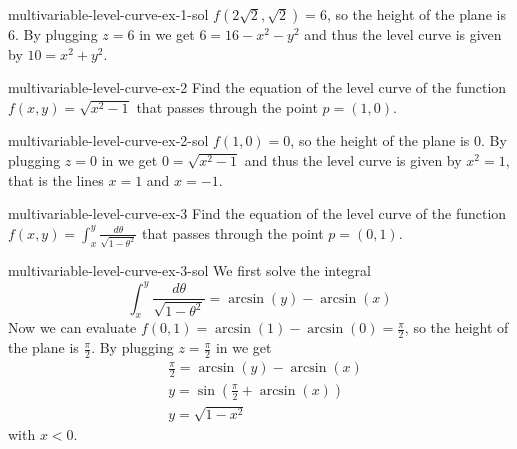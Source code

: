 \documentclass[preview]{standalone}
\begin{document}
\begin{snippetsolution}{multivariable-level-curve-ex-1-sol}{}
    \phantom{}\(f(2\sqrt{2}, \sqrt{2}) = 6\), so the height of the plane is 6.
    By plugging \(z=6\) in we get \(6=16-x^2-y^2\)
    and thus the level curve is given by \(10=x^2+y^2\).
\end{snippetsolution}

\begin{snippetexercise}{multivariable-level-curve-ex-2}{}
    Find the equation of the level curve of the function \(f(x,y) = \sqrt{x^2-1}\)
    that passes through the point \(p=(1,0)\).
\end{snippetexercise}

\begin{snippetsolution}{multivariable-level-curve-ex-2-sol}{}
    \phantom{}\(f(1, 0) = 0\), so the height of the plane is 0.
    By plugging \(z=0\) in we get \(0 = \sqrt{x^2-1}\)
    and thus the level curve is given by \(x^2=1\), that is
    the lines \(x=1\) and \(x=-1\).
\end{snippetsolution}

\begin{snippetexercise}{multivariable-level-curve-ex-3}{}
    Find the equation of the level curve of the function \(f(x,y) = \int_x^y \frac{d\theta}{\sqrt{1-\theta^2}}\)
    that passes through the point \(p=(0,1)\).
\end{snippetexercise}

\begin{snippetsolution}{multivariable-level-curve-ex-3-sol}{}
    We first solve the integral
    \[ \int_x^y \frac{d\theta}{\sqrt{1-\theta^2}} = \arcsin(y) - \arcsin(x) \]
    Now we can evaluate \(f(0,1) = \arcsin(1) - \arcsin(0) = \frac{\pi}{2}\),
    so the height of the plane is \(\frac{\pi}{2}\).
    By plugging \(z=\frac{\pi}{2}\) in we get
    \begin{align*}
        &\frac{\pi}{2} = \arcsin(y) - \arcsin(x) \\
        &y = \sin\left( \frac{\pi}{2} + \arcsin(x) \right) \\
        &y = \sqrt{1-x^2}
    \end{align*}
    with \(x < 0\).
\end{snippetsolution}
\end{document}
